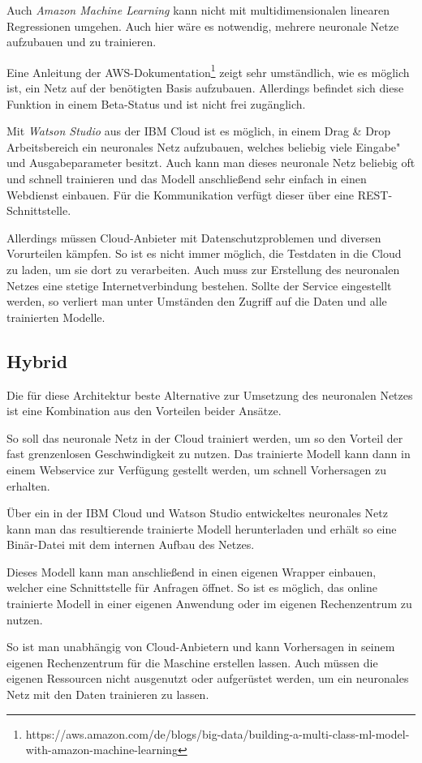 Auch \textit{Amazon Machine Learning} kann nicht mit multidimensionalen linearen Regressionen umgehen. Auch hier wäre es
notwendig, mehrere neuronale Netze aufzubauen und zu trainieren.

Eine Anleitung der
AWS-Dokumentation\footnote{https://aws.amazon.com/de/blogs/big-data/building-a-multi-class-ml-model-with-amazon-machine-learning}
zeigt sehr umständlich, wie es möglich ist, ein Netz auf der benötigten Basis aufzubauen. Allerdings befindet sich diese
Funktion in einem Beta-Status und ist nicht frei zugänglich.

Mit \textit{Watson Studio} aus der IBM Cloud ist es möglich, in einem Drag \& Drop Arbeitsbereich ein neuronales Netz
aufzubauen, welches beliebig viele Eingabe"~ und Ausgabeparameter besitzt. Auch kann man dieses neuronale Netz beliebig
oft und schnell trainieren und das Modell anschließend sehr einfach in einen Webdienst einbauen. Für die Kommunikation
verfügt dieser über eine REST-Schnittstelle.

Allerdings müssen Cloud-Anbieter mit Datenschutzproblemen und diversen Vorurteilen kämpfen. So ist es nicht immer
möglich, die Testdaten in die Cloud zu laden, um sie dort zu verarbeiten. Auch muss zur Erstellung des neuronalen Netzes
eine stetige Internetverbindung bestehen. Sollte der Service eingestellt werden, so verliert man unter Umständen den
Zugriff auf die Daten und alle trainierten Modelle.

\subsection{Hybrid}
Die für diese Architektur beste Alternative zur Umsetzung des neuronalen Netzes ist eine Kombination aus den Vorteilen
beider Ansätze.

So soll das neuronale Netz in der Cloud trainiert werden, um so den Vorteil der fast grenzenlosen Geschwindigkeit zu
nutzen. Das trainierte Modell kann dann in einem Webservice zur Verfügung gestellt werden, um schnell Vorhersagen zu
erhalten.

Über ein in der IBM Cloud und Watson Studio entwickeltes neuronales Netz kann man das resultierende trainierte Modell
herunterladen und erhält so eine Binär-Datei mit dem internen Aufbau des Netzes.

Dieses Modell kann man anschließend in einen eigenen Wrapper einbauen, welcher eine Schnittstelle für Anfragen öffnet.
So ist es möglich, das online trainierte Modell in einer eigenen Anwendung oder im eigenen Rechenzentrum zu nutzen.

So ist man unabhängig von Cloud-Anbietern und kann Vorhersagen in seinem eigenen Rechenzentrum für die Maschine
erstellen lassen. Auch müssen die eigenen Ressourcen nicht ausgenutzt oder aufgerüstet werden, um ein neuronales Netz
mit den Daten trainieren zu lassen.
